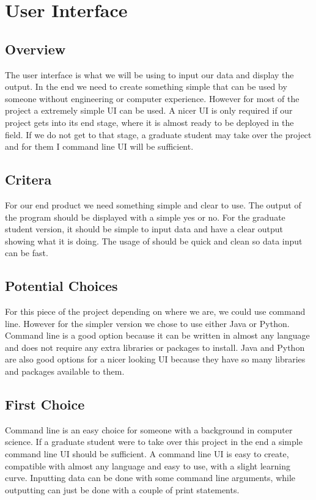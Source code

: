 \documentclass[10pt, draftclsnofoot, onecolumn]{IEEEtran}
\begin{document}
\section{User Interface}
	\subsection{Overview}
	The user interface is what we will be using to input our data and display the output. In the end we need to create something simple that can be used by someone without engineering or computer experience. However for most of the project a extremely simple UI can be used. A nicer UI is only required if our project gets into its end stage, where it is almost ready to be deployed in the field. If we do not get to that stage, a graduate student may take over the project and for them I command line UI will be sufficient.	
	\subsection{Critera}
	For our end product we need something simple and clear to use. The output of the program should be displayed with a simple yes or no. For the graduate student version, it should be simple to input data and have a clear output showing what it is doing. The usage of should be quick and clean so data input can be fast.
	\subsection{Potential Choices}
	For this piece of the project depending on where we are, we could use command line. However for the simpler version we chose to use either Java or Python. Command line is a good option because it can be written in almost any language and does not require any extra libraries or packages to install. Java and Python are also good options for a nicer looking UI because they have so many libraries and packages available to them.
	\subsection{First Choice}
	Command line is an easy choice for someone with a background in computer science. If a graduate student were to take over this project in the end a simple command line UI should be sufficient. A command line UI is easy to create, compatible with almost any language and easy to use, with a slight learning curve. Inputting data can be done with some command line arguments, while outputting can just be done with a couple of print statements.
\end{document}
